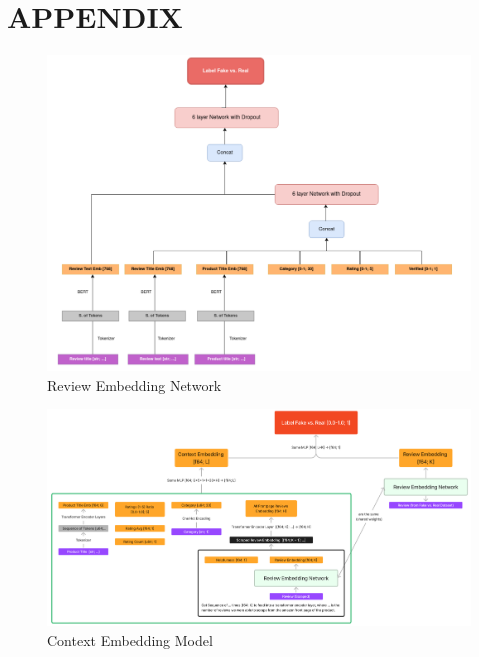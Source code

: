 \documentclass[utf8x]{ctexart}
\begin{document}
\renewcommand\refname{Bibliography}




\pagebreak
\section{APPENDIX}



\begin{figure}[htb]
  \centering
  \includegraphics[width=\linewidth]{./3bert.png}
  \caption{Review Embedding Network}
  \label{fig:3bert}
\end{figure}

\begin{figure}[htb]
  \centering
  \includegraphics[width=\linewidth]{./cem.png}
  \caption{Context Embedding Model}
  \label{fig:cem}
\end{figure}
\end{document}
